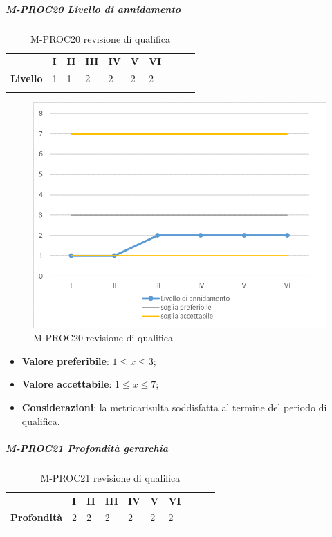 \subparagraph{M-PROC20 Livello di annidamento} \mbox{}
\begin{longtable}[H!] {						
		>{}p{50mm}  		
		>{}p{8mm}
		>{}p{8mm}		
		>{}p{8mm}		
		>{}p{8mm}		
		>{}p{8mm}		
		>{}p{8mm}
		>{}p{8mm}
		>{}p{8mm}
		>{}p{8mm}
	}
	\rowcolor{gray!50}
	\textbf{} & \textbf{I} & \textbf{II} & \textbf{III} & \textbf{IV} & \textbf{V} & \textbf{VI} \TBstrut \\ [2mm]
	\textbf{Livello} & 1 & 1 & 2 & 2 & 2 & 2 \TBstrut \\ [2mm]
	\rowcolor{white}
	\caption{M-PROC20 revisione di qualifica}
\end{longtable}
\begin{figure}[H] 	
	\includegraphics[width=\linewidth]{./img/grafici/RQ20.png}	
	\caption{M-PROC20 revisione di qualifica}	
\end{figure}
\begin{itemize}
	\item \textbf{Valore preferibile}: $1\le x \le 3$;
	\item \textbf{Valore accettabile}: $1 \le x \le 7$;
	\item \textbf{Considerazioni}: la metrica\glosp risulta soddisfatta al termine del periodo di qualifica.
\end{itemize}
\subparagraph{M-PROC21 Profondità gerarchia} \mbox{}
\begin{longtable}[H!] {						
		>{}p{50mm}  		
		>{}p{8mm}
		>{}p{8mm}		
		>{}p{8mm}		
		>{}p{8mm}		
		>{}p{8mm}		
		>{}p{8mm}
		>{}p{8mm}
		>{}p{8mm}
		>{}p{8mm}
	}
	\rowcolor{gray!50}
	\textbf{} & \textbf{I} & \textbf{II} & \textbf{III} & \textbf{IV} & \textbf{V} & \textbf{VI} \TBstrut \\ [2mm]
	\textbf{Profondità} & 2 & 2 & 2 & 2 & 2 & 2 \TBstrut \\ [2mm]
	\rowcolor{white}
	\caption{M-PROC21 revisione di qualifica}
\end{longtable}
